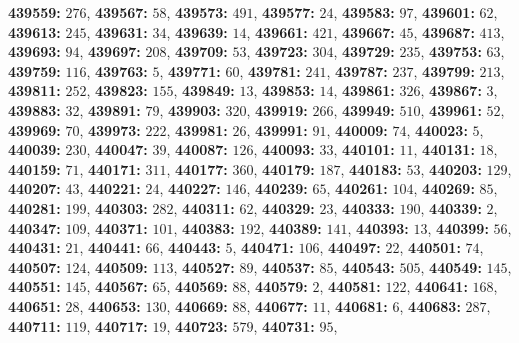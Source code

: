 \textsf{\bfseries 439559:} $276$, \textsf{\bfseries 439567:} $58$, \textsf{\bfseries 439573:} $491$, \textsf{\bfseries 439577:} $24$, \textsf{\bfseries 439583:} $97$, \textsf{\bfseries 439601:} $62$, \textsf{\bfseries 439613:} $245$, \textsf{\bfseries 439631:} $34$, \textsf{\bfseries 439639:} $14$, \textsf{\bfseries 439661:} $421$, \textsf{\bfseries 439667:} $45$, \textsf{\bfseries 439687:} $413$, \textsf{\bfseries 439693:} $94$, \textsf{\bfseries 439697:} $208$, \textsf{\bfseries 439709:} $53$, \textsf{\bfseries 439723:} $304$, \textsf{\bfseries 439729:} $235$, \textsf{\bfseries 439753:} $63$, \textsf{\bfseries 439759:} $116$, \textsf{\bfseries 439763:} $5$, \textsf{\bfseries 439771:} $60$, \textsf{\bfseries 439781:} $241$, \textsf{\bfseries 439787:} $237$, \textsf{\bfseries 439799:} $213$, \textsf{\bfseries 439811:} $252$, \textsf{\bfseries 439823:} $155$, \textsf{\bfseries 439849:} $13$, \textsf{\bfseries 439853:} $14$, \textsf{\bfseries 439861:} $326$, \textsf{\bfseries 439867:} $3$, \textsf{\bfseries 439883:} $32$, \textsf{\bfseries 439891:} $79$, \textsf{\bfseries 439903:} $320$, \textsf{\bfseries 439919:} $266$, \textsf{\bfseries 439949:} $510$, \textsf{\bfseries 439961:} $52$, \textsf{\bfseries 439969:} $70$, \textsf{\bfseries 439973:} $222$, \textsf{\bfseries 439981:} $26$, \textsf{\bfseries 439991:} $91$, \textsf{\bfseries 440009:} $74$, \textsf{\bfseries 440023:} $5$, \textsf{\bfseries 440039:} $230$, \textsf{\bfseries 440047:} $39$, \textsf{\bfseries 440087:} $126$, \textsf{\bfseries 440093:} $33$, \textsf{\bfseries 440101:} $11$, \textsf{\bfseries 440131:} $18$, \textsf{\bfseries 440159:} $71$, \textsf{\bfseries 440171:} $311$, \textsf{\bfseries 440177:} $360$, \textsf{\bfseries 440179:} $187$, \textsf{\bfseries 440183:} $53$, \textsf{\bfseries 440203:} $129$, \textsf{\bfseries 440207:} $43$, \textsf{\bfseries 440221:} $24$, \textsf{\bfseries 440227:} $146$, \textsf{\bfseries 440239:} $65$, \textsf{\bfseries 440261:} $104$, \textsf{\bfseries 440269:} $85$, \textsf{\bfseries 440281:} $199$, \textsf{\bfseries 440303:} $282$, \textsf{\bfseries 440311:} $62$, \textsf{\bfseries 440329:} $23$, \textsf{\bfseries 440333:} $190$, \textsf{\bfseries 440339:} $2$, \textsf{\bfseries 440347:} $109$, \textsf{\bfseries 440371:} $101$, \textsf{\bfseries 440383:} $192$, \textsf{\bfseries 440389:} $141$, \textsf{\bfseries 440393:} $13$, \textsf{\bfseries 440399:} $56$, \textsf{\bfseries 440431:} $21$, \textsf{\bfseries 440441:} $66$, \textsf{\bfseries 440443:} $5$, \textsf{\bfseries 440471:} $106$, \textsf{\bfseries 440497:} $22$, \textsf{\bfseries 440501:} $74$, \textsf{\bfseries 440507:} $124$, \textsf{\bfseries 440509:} $113$, \textsf{\bfseries 440527:} $89$, \textsf{\bfseries 440537:} $85$, \textsf{\bfseries 440543:} $505$, \textsf{\bfseries 440549:} $145$, \textsf{\bfseries 440551:} $145$, \textsf{\bfseries 440567:} $65$, \textsf{\bfseries 440569:} $88$, \textsf{\bfseries 440579:} $2$, \textsf{\bfseries 440581:} $122$, \textsf{\bfseries 440641:} $168$, \textsf{\bfseries 440651:} $28$, \textsf{\bfseries 440653:} $130$, \textsf{\bfseries 440669:} $88$, \textsf{\bfseries 440677:} $11$, \textsf{\bfseries 440681:} $6$, \textsf{\bfseries 440683:} $287$, \textsf{\bfseries 440711:} $119$, \textsf{\bfseries 440717:} $19$, \textsf{\bfseries 440723:} $579$, \textsf{\bfseries 440731:} $95$, 
